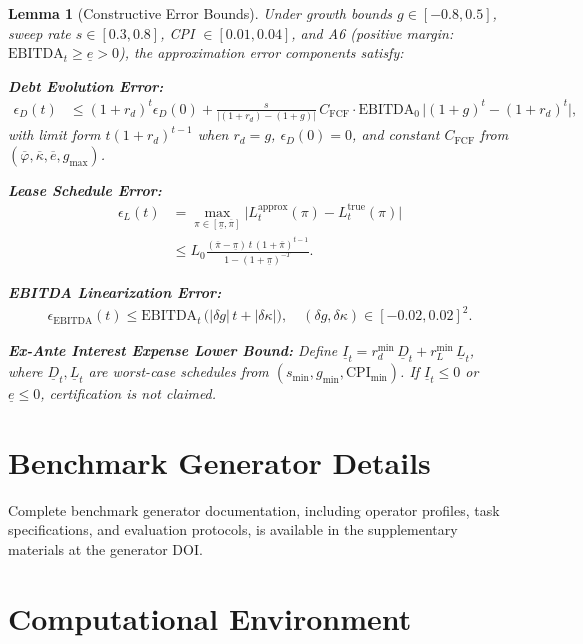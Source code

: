 \documentclass[11pt,a4paper]{article}
\theoremstyle{plain}
\newtheorem{lemma}{Lemma}
\theoremstyle{definition}
\begin{document}
\begin{lemma}[Constructive Error Bounds]
\label{lem:error_bounds}
Under growth bounds $g \in [-0.8,0.5]$, sweep rate $s \in [0.3,0.8]$, CPI $\in [0.01,0.04]$, and A6 (positive margin: $\text{EBITDA}_t \ge \underline{e} > 0$), the approximation error components satisfy:

\textbf{Debt Evolution Error:}
\begin{align}
\epsilon_D(t) &\le (1+r_d)^t \epsilon_D(0) + \frac{s}{|(1+r_d)-(1+g)|}\, C_{\mathrm{FCF}} \cdot \text{EBITDA}_0 \,\bigl|(1+g)^t - (1+r_d)^t\bigr|,
\end{align}
with limit form $t(1+r_d)^{t-1}$ when $r_d=g$, $\epsilon_D(0)=0$, and constant $C_{\mathrm{FCF}}$ from $(\overline{\varphi},\overline{\kappa},\overline{e},g_{\max})$.

\textbf{Lease Schedule Error:}
\begin{align}
\epsilon_L(t) &= \max_{\pi \in [\underline{\pi},\overline{\pi}]}\bigl|L^{\text{approx}}_t(\pi)-L^{\text{true}}_t(\pi)\bigr| \\
&\le L_0 \frac{(\overline{\pi}-\underline{\pi})\, t\, (1+\overline{\pi})^{t-1}}{1-(1+\underline{\pi})^{-T}}.
\end{align}

\textbf{EBITDA Linearization Error:}
\begin{align}
\epsilon_{\text{EBITDA}}(t) \le \text{EBITDA}_t \,\bigl(|\delta g|\, t + |\delta \kappa|\bigr), \quad (\delta g,\delta \kappa)\in[-0.02,0.02]^2.
\end{align}

\textbf{Ex-Ante Interest Expense Lower Bound:}
Define $\underline{I}_t = r_d^{\min}\,\underline{D}_t + r_L^{\min}\,\underline{L}_t$, where $\underline{D}_t,\underline{L}_t$ are worst-case schedules from $(s_{\min},g_{\min},\text{CPI}_{\min})$. If $\underline{I}_t \le 0$ or $\underline{e}\le 0$, certification is not claimed.
\end{lemma}

\section{Benchmark Generator Details}
\label{app:benchmark}
Complete benchmark generator documentation, including operator profiles, task specifications, and evaluation protocols, is available in the supplementary materials at the generator DOI.

\section{Computational Environment}
\label{app:computation}
\end{document}
